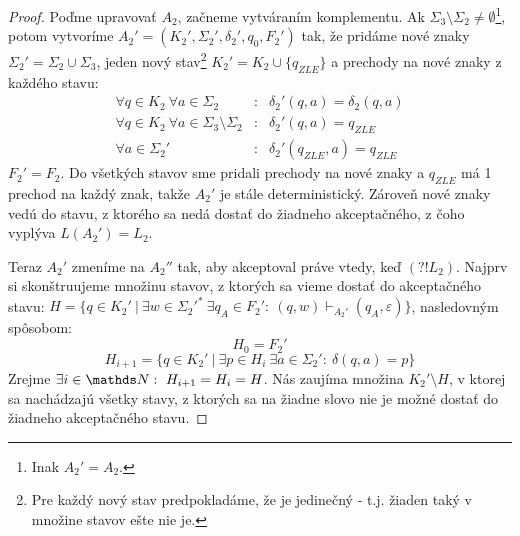 \begin{proof}
Poďme upravovať $A_2$, začneme vytváraním komplementu. Ak $\Sigma_3 \setminus \Sigma_2 \neq\emptyset$\footnote{Inak $A_2'=A_2$.}, potom vytvoríme $A_2'= (K_2',\Sigma_2',\delta_2',q_{0},F_2')$ tak, že pridáme nové znaky $\Sigma_2'=\Sigma_2 \cup \Sigma_3$,  jeden nový stav\footnote{Pre každý nový stav predpokladáme, že je jedinečný - t.j. žiaden taký v množine stavov ešte nie je.} $K_2'=K_2 \cup \lbrace q_{ZLE} \rbrace$ a prechody na nové znaky z každého stavu: 
\begin{eqnarray*}
 \forall q \in K_2 ~ \forall a \in \Sigma_2 &:&  \delta_2'(q,a)=\delta_2(q,a) \\
 \forall q \in K_2~ \forall a \in \Sigma_3 \setminus \Sigma_2 &:& \delta_2'(q,a)=q_{ZLE} \\
 \forall a \in \Sigma_2' &:&  \delta_2'(q_{ZLE},a)=q_{ZLE}
\end{eqnarray*}
 $F_2'=F_2.$ Do všetkých stavov sme pridali prechody na nové znaky a $q_{ZLE}$ má 1 prechod na každý znak, takže $A_2'$ je stále deterministický. Zároveň nové znaky vedú do stavu, z ktorého sa nedá dostať do žiadneho akceptačného, z čoho vyplýva $L(A_2')=L_2$.

Teraz $A_2'$ zmeníme na $A_2''$ tak, aby akceptoval práve vtedy, keď $(?!L_2)$. Najprv si skonštruujeme množinu stavov, z ktorých sa vieme dostať do akceptačného stavu: $H= \lbrace  q \in K_2'~|~ \exists w \in {\Sigma_2'}^* ~ \exists q_A \in F_2': ~ (q,w)\vdash_{A_2'}(q_A,\varepsilon) \rbrace $, nasledovným spôsobom: $$ H_0 = F_2' $$ 
$$H_{i+1} = \lbrace q \in K_2'~|~ \exists p \in H_i~ \exists a \in \Sigma_2': ~ \delta(q,a)=p \rbrace$$
Zrejme $\exists i \in \N: ~ H_{i+1}=H_i = H$. Nás zaujíma množina $K_2' \setminus H$, v ktorej sa nachádzajú všetky stavy, z ktorých sa na žiadne slovo nie je možné dostať do žiadneho akceptačného stavu.


\end{proof}
